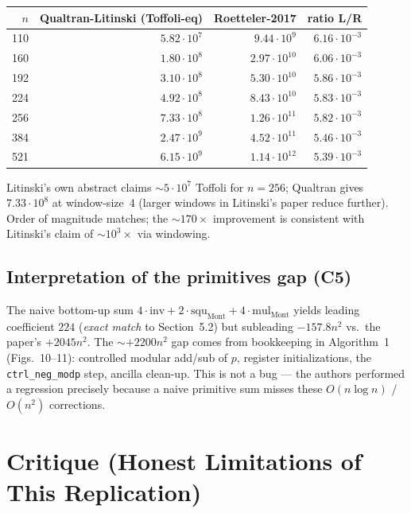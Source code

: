\documentclass[11pt]{article}
\begin{document}
\begin{center}
\begin{tabular}{rrrr}
\toprule
$n$ & Qualtran-Litinski (Toffoli-eq) & Roetteler-2017 & ratio L/R \\
\midrule
110 & $5.82{\cdot}10^7$ & $9.44{\cdot}10^9$  & $6.16{\cdot}10^{-3}$ \\
160 & $1.80{\cdot}10^8$ & $2.97{\cdot}10^{10}$ & $6.06{\cdot}10^{-3}$ \\
192 & $3.10{\cdot}10^8$ & $5.30{\cdot}10^{10}$ & $5.86{\cdot}10^{-3}$ \\
224 & $4.92{\cdot}10^8$ & $8.43{\cdot}10^{10}$ & $5.83{\cdot}10^{-3}$ \\
256 & $7.33{\cdot}10^8$ & $1.26{\cdot}10^{11}$ & $5.82{\cdot}10^{-3}$ \\
384 & $2.47{\cdot}10^9$ & $4.52{\cdot}10^{11}$ & $5.46{\cdot}10^{-3}$ \\
521 & $6.15{\cdot}10^9$ & $1.14{\cdot}10^{12}$ & $5.39{\cdot}10^{-3}$ \\
\bottomrule
\end{tabular}
\end{center}

Litinski's own abstract claims $\sim 5{\cdot}10^7$ Toffoli for $n=256$; Qualtran
gives $7.33{\cdot}10^8$ at window-size~4 (larger windows in Litinski's paper
reduce further). Order of magnitude matches; the $\sim 170\times$ improvement is
consistent with Litinski's claim of $\sim 10^3\times$ via windowing.

\subsection{Interpretation of the primitives gap (C5)}

The naive bottom-up sum $4\cdot\mathrm{inv} + 2\cdot\mathrm{squ}_{\mathrm{Mont}}
+ 4\cdot\mathrm{mul}_{\mathrm{Mont}}$ yields leading coefficient $224$
(\emph{exact match} to Section~5.2) but subleading $-157.8 n^2$ vs.\ the paper's
$+2045 n^2$. The $\sim +2200 n^2$ gap comes from bookkeeping in Algorithm~1
(Figs.~10--11): controlled modular add/sub of $p$, register initializations, the
\texttt{ctrl\_neg\_modp} step, ancilla clean-up. This is not a bug --- the
authors performed a regression precisely because a naive primitive sum misses
these $O(n \log n)$ / $O(n^2)$ corrections.

\section{Critique (Honest Limitations of This Replication)}
\end{document}
